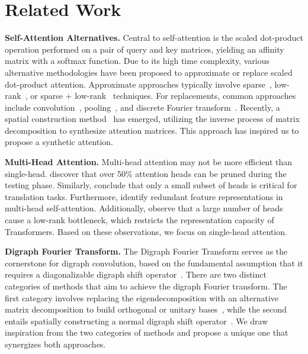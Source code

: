 \section{Related Work}
\noindent\textbf{Self-Attention Alternatives.}
Central to self-attention is the scaled dot-product operation performed on a pair of query and key matrices, yielding an affinity matrix with a softmax function. Due to its high time complexity, various alternative methodologies have been proposed to approximate or replace scaled dot-product attention. Approximate approaches typically involve sparse~\citep{child2019generating,Kitaev2020Reformer,NEURIPS2020_c8512d14}, low-rank~\citep{choromanski2021rethinking}, or sparse $\text{+}$ low-rank~\citep{NEURIPS2021_9185f3ec} techniques. For replacements, common approaches include convolution~\citep{yu2022metaformer}, pooling~\citep{Yu_2022_CVPR}, and discrete Fourier transform~\citep{lee-thorp-etal-2022-fnet}. Recently, a spatial construction method~\citep{pmlr-v139-tay21a,9878955} has emerged, utilizing the inverse process of matrix decomposition to synthesize attention matrices. This approach has inspired us to propose a synthetic attention.

\noindent\textbf{Multi-Head Attention.}
Multi-head attention may not be more efficient than single-head. \citet{NEURIPS2019_2c601ad9} discover that over 50\% attention heads can be pruned during the testing phase. Similarly, \citet{voita-etal-2019-analyzing} conclude that only a small subset of heads is critical for translation tasks. Furthermore, \citet{cordonnier2020multihead} identify redundant feature representations in multi-head self-attention. Additionally, \citet{pmlr-v119-bhojanapalli20a} observe that a large number of heads cause a low-rank bottleneck, which restricts the representation capacity of Transformers. Based on these observations, we focus on single-head attention.

\noindent\textbf{Digraph Fourier Transform.}
The Digraph Fourier Transform serves as the cornerstone for digraph convolution, based on the fundamental assumption that it requires a diagonalizable digraph shift operator~\citep{10388222}. There are two distinct categories of methods that aim to achieve the digraph Fourier transform. The first category involves replacing the eigendecomposition with an alternative matrix decomposition to build orthogonal or unitary bases~\citep{6409473,6638850,6808520,7746675}, while the second entails spatially constructing a normal digraph shift operator~\citep{Chung2005,PhysRevE.95.022302,FANUEL2018189}. We draw inspiration from the two categories of methods and propose a unique one that synergizes both approaches.

